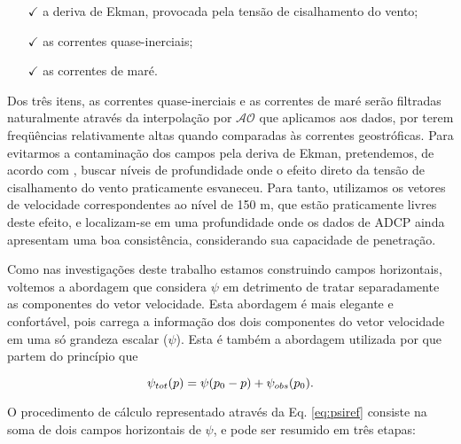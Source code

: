 \documentclass[12pt,portuguese,a4paper,pdftex]{article}
\begin{document}
\begin{itemize}

\item[$\checkmark$] a deriva de Ekman, provocada pela tensão de cisalhamento do vento;

\item[$\checkmark$] as correntes quase-inerciais;

\item[$\checkmark$] as correntes de maré.   

\end{itemize}

Dos três itens, as correntes quase-inerciais e as correntes de maré serão filtradas naturalmente através 
da interpolação por $\mathcal{AO}$ que aplicamos aos dados, por terem freq\"uências relativamente altas quando comparadas às
correntes geostróficas. Para evitarmos a contaminação dos campos pela deriva de Ekman, pretendemos, de acordo com \cite{sutton_chereskin2002},
buscar níveis de profundidade onde o efeito direto da tensão de cisalhamento do vento praticamente esvaneceu. 
Para tanto, utilizamos os vetores de velocidade correspondentes ao nível de 150 m, que estão praticamente livres deste efeito,
e localizam-se em uma profundidade onde os dados de ADCP ainda apresentam uma boa consistência, considerando sua 
capacidade de penetração.

Como nas investigações deste trabalho estamos construindo campos horizontais, voltemos a abordagem que 
considera $\psi$ em detrimento de tratar separadamente as componentes do vetor velocidade. Esta abordagem é 
mais elegante e confortável, pois carrega a informação dos dois componentes do vetor velocidade em uma só
grandeza escalar ($\psi$). Esta é também a abordagem utilizada por \cite{sutton_chereskin2002} que partem
do princípio que 

\begin{equation}
\psi_{tot}(p) = \psi(p_0-p) + \psi_{obs}(p_0).
\vspace{0.5cm}
\label{eq:psiref}
\end{equation}

O procedimento de cálculo representado através da Eq. \ref{eq:psiref} consiste na soma
 de dois campos horizontais de $\psi$, e pode ser resumido em três etapas: 
\end{document}
